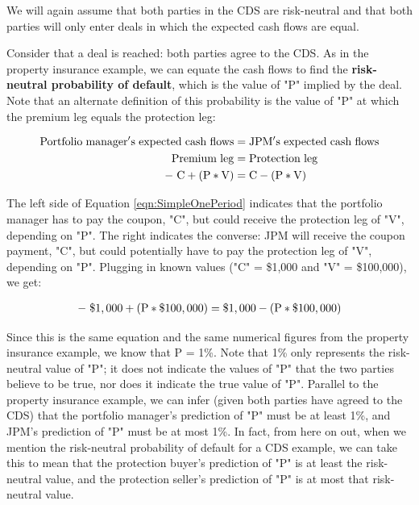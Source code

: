 \documentclass[article]{jss}
\begin{document}
We will again assume that both parties in the CDS are risk-neutral and that both parties will only enter deals in which the expected cash flows are equal.

Consider that a deal is reached: both parties agree to the CDS. As in the property insurance example, we can equate the cash flows to find the \textbf{risk-neutral probability of default}, which is the value of "P" implied by the deal. Note that an alternate definition of this probability is the value of "P" at which the premium leg equals the protection leg:

\label{eqn:SimpleOnePeriod}
\begin{align}
   \rm Portfolio\hspace{3pt}manager's\hspace{3pt}expected\hspace{3pt}cash\hspace{3pt}flows &= \rm JPM's\hspace{3  pt}expected\hspace{3pt}cash\hspace{3pt}flows \\
   \rm Premium\hspace{3pt}leg &= \rm Protection\hspace{3pt}leg \\
   \rm -\hspace{3pt}C + (P * V)  &= \rm C - (P * V)
\end{align}

The left side of Equation \ref{eqn:SimpleOnePeriod} indicates that the portfolio manager has to pay the coupon, "C", but could receive the protection leg of "V", depending on "P". The right indicates the converse: JPM will receive the coupon payment, "C", but could potentially have to pay the protection leg of "V", depending on "P".
Plugging in known values ("C" = \$1,000 and "V" = \$100,000), we get:

\begin{equation}
 \begin{aligned}
   {\rm -\hspace{3pt}\$1,000 + (P * {\$100,000})  = \$1,000 - (P * {\$100,000})}
    \end{aligned}
\end{equation}

Since this is the same equation and the same numerical figures from the property insurance example, we know that P = 1\%. Note that 1\% only represents the risk-neutral value of "P"; it does not indicate the values of "P" that the two parties believe to be true, nor does it indicate the true value of "P". Parallel to the property insurance example, we can infer (given both parties have agreed to the CDS) that the portfolio manager's prediction of "P" must be at least 1\%, and JPM's prediction of "P" must be at most 1\%. In fact, from here on out, when we mention the risk-neutral probability of default for a CDS example, we can take this to mean that the protection buyer's prediction of "P" is at least the risk-neutral value, and the protection seller's prediction of "P" is at most that risk-neutral value.
\end{document}
